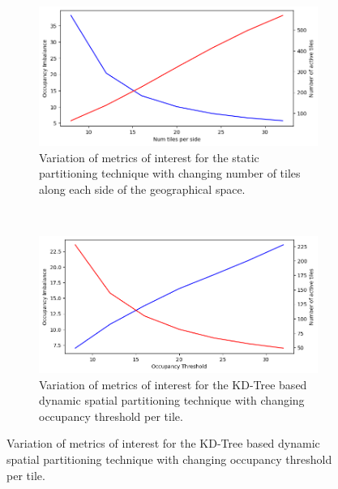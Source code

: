 \begin{figure}
\centering
\begin{subfigure}{0.45\textwidth}
  \centering
  \includegraphics[width=\linewidth]{figures/design_space/spatial/metrics_Grid.png}
  \caption{Variation of metrics of interest for the static partitioning technique with changing number of tiles along each side of the geographical space.}
  \label{fig:static_part}
\end{subfigure}
~~~~
\begin{subfigure}{0.45\textwidth}
  \centering
  \includegraphics[width=\linewidth]{figures/design_space/spatial/metrics_KDTree.png}
  \caption{Variation of metrics of interest for the KD-Tree based dynamic spatial partitioning technique with changing occupancy threshold per tile.}
  \label{fig:kdtree_part}
\end{subfigure}\par\medskip
\end{figure}

